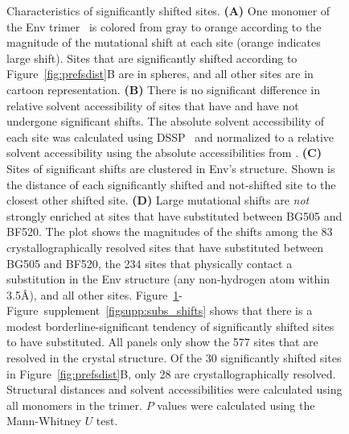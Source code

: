 \documentclass[9pt]{elife}
\newcommand{\angstrom}{\textup{\AA}}
\begin{document}
\begin{figure}
\caption{\label{fig:shiftfeatures}
Characteristics of significantly shifted sites.
{\bf (A)} One monomer of the Env trimer~\citep[PDB 5FYL;][]{stewart2016trimeric} is colored from gray to orange according to the magnitude of the mutational shift at each site (orange indicates large shift).
Sites that are significantly shifted according to Figure~\ref{fig:prefsdist}B are in spheres, and all other sites are in cartoon representation.
{\bf (B)} 
There is no significant difference in relative solvent accessibility of sites that have and have not undergone significant shifts.
The absolute solvent accessibility of each site was calculated using DSSP~\citep{kabsch1983dictionary} and normalized to a relative solvent accessibility using the absolute accessibilities from \citet{tien2013maximum}.
{\bf (C)} 
Sites of significant shifts are clustered in Env's structure.
Shown is the distance of each significantly shifted and not-shifted site to the closest other shifted site.
{\bf (D)}
Large mutational shifts are \emph{not} strongly enriched at sites that have substituted between BG505 and BF520. 
The plot shows the magnitudes of the shifts among the 83 crystallographically resolved sites that have substituted between BG505 and BF520, the 234 sites that physically contact a substitution in the Env structure (any non-hydrogen atom within 3.5\angstrom), and all other sites.
Figure~\ref{fig:shiftfeatures}-Figure~supplement~\ref{figsupp:subs_shifts} shows that there is a modest borderline-significant tendency of significantly shifted sites to have substituted.
All panels only show the 577 sites that are resolved in the crystal structure.
Of the 30 significantly shifted sites in Figure~\ref{fig:prefsdist}B, only 28 are crystallographically resolved.
Structural distances and solvent accessibilities were calculated using all monomers in the trimer.
$P$ values were calculated using the Mann-Whitney $U$ test.
}
{}
\end{figure}
\end{document}
